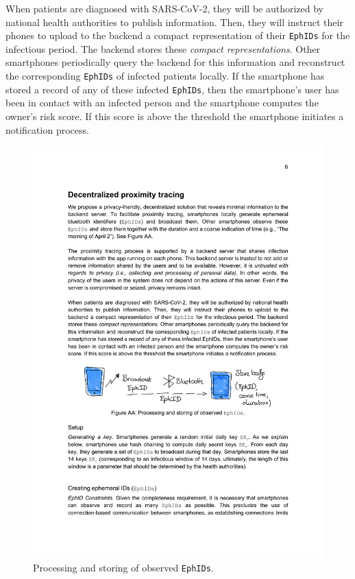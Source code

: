 \documentclass[10.8pt,a4paper]{article}
\begin{document}
When patients are diagnosed with SARS-CoV-2, they will be authorized by national health
authorities to publish information. Then, they will instruct their phones to upload to the
backend a compact representation of their \texttt{EphIDs} for the infectious period. The backend stores these \textit{compact representations}. Other smartphones periodically query the backend for this information and reconstruct the corresponding \texttt{EphIDs} of infected patients locally. If the smartphone has stored a record of any of these infected \texttt{EphIDs}, then the smartphone’s user has been in contact with an infected person and the smartphone computes the owner’s risk score. If this score is above the threshold the smartphone initiates a notification process.
\begin{figure}[H]
\centering
\includegraphics[scale=0.6]{fig/AA}
\caption{Processing and storing of observed \texttt{EphIDs}.}
\label{AA}
\end{figure}
\end{document}
